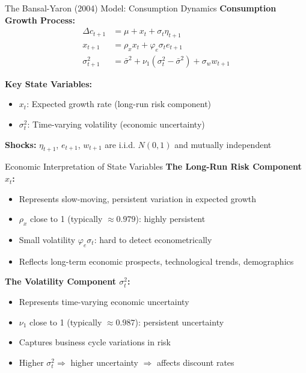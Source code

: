 \documentclass{beamer}
\begin{document}
\begin{frame}{The Bansal-Yaron (2004) Model: Consumption Dynamics}
    \textbf{Consumption Growth Process:}
    \begin{align}
        \Delta c_{t+1} &= \mu + x_t + \sigma_t \eta_{t+1} \label{eq:cons}\\
        x_{t+1} &= \rho_x x_t + \varphi_e \sigma_t e_{t+1} \label{eq:x}\\
        \sigma_{t+1}^2 &= \bar{\sigma}^2 + \nu_1 (\sigma_t^2 - \bar{\sigma}^2) + \sigma_w w_{t+1} \label{eq:vol}
    \end{align}
    
    \vspace{0.3cm}
    \textbf{Key State Variables:}
    \begin{itemize}
        \item $x_t$: Expected growth rate (long-run risk component)
        \item $\sigma_t^2$: Time-varying volatility (economic uncertainty)
    \end{itemize}
    
    \vspace{0.3cm}
    \textbf{Shocks:} $\eta_{t+1}$, $e_{t+1}$, $w_{t+1}$ are i.i.d. $N(0,1)$ and mutually independent
\end{frame}

\begin{frame}{Economic Interpretation of State Variables}
    \textbf{The Long-Run Risk Component $x_t$:}
    \begin{itemize}
        \item Represents slow-moving, persistent variation in expected growth
        \item $\rho_x$ close to 1 (typically $\approx 0.979$): highly persistent
        \item Small volatility $\varphi_e \sigma_t$: hard to detect econometrically
        \item Reflects long-term economic prospects, technological trends, demographics
    \end{itemize}
    
    \vspace{0.3cm}
    \textbf{The Volatility Component $\sigma_t^2$:}
    \begin{itemize}
        \item Represents time-varying economic uncertainty
        \item $\nu_1$ close to 1 (typically $\approx 0.987$): persistent uncertainty
        \item Captures business cycle variations in risk
        \item Higher $\sigma_t^2 \Rightarrow$ higher uncertainty $\Rightarrow$ affects discount rates
    \end{itemize}
\end{frame}
\end{document}
